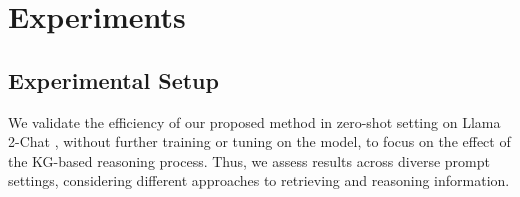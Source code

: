 \documentclass{article}
\begin{document}
   
   
   
   
   



\section{Experiments}

\subsection{Experimental Setup}
We validate the efficiency of our proposed method in zero-shot setting on Llama 2-Chat \citep{touvron2023llama}, without further training or tuning on the model, to focus on the effect of the KG-based reasoning process. Thus, we assess results across diverse prompt settings, considering different approaches to retrieving and reasoning information.
\end{document}

